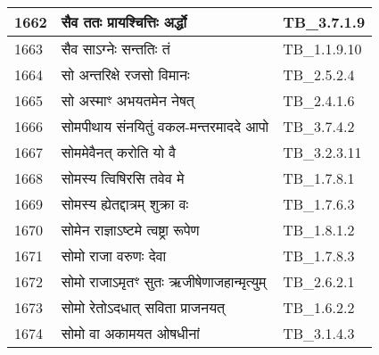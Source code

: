 \documentclass[17pt]{extarticle}
\begin{document}
\begin{longtable}{||p{0.4in}||p{4.9in}||p{0.9in}||}
    1662 & सैव ततः प्रायश्चित्तिः अर्द्धो & TB\_3.7.1.9       \\
    
    \hline
        
    1663 & सैव साऽग्नेः सन्ततिः तं & TB\_1.1.9.10       \\
    
    \hline
        
    1664 & सो अन्तरिक्षे रजसो विमानः & TB\_2.5.2.4       \\
    
    \hline
        
    1665 & सो अस्माꣳ अभयतमेन नेषत् & TB\_2.4.1.6       \\
    
    \hline
        
    1666 & सोमपीथाय संनयितुं वकल{-}मन्तरमाददे आपो & TB\_3.7.4.2       \\
    
    \hline
        
    1667 & सोममेवैनत् करोति यो वै & TB\_3.2.3.11       \\
    
    \hline
        
    1668 & सोमस्य त्विषिरसि तवेव मे & TB\_1.7.8.1       \\
    
    \hline
        
    1669 & सोमस्य ह्येतद्दात्रम् शुक्रा वः & TB\_1.7.6.3       \\
    
    \hline
        
    1670 & सोमेन राज्ञाऽष्टमे त्वष्ट्रा रूपेण & TB\_1.8.1.2       \\
    
    \hline
        
    1671 & सोमो राजा वरुणः देवा & TB\_1.7.8.3       \\
    
    \hline
        
    1672 & सोमो राजाऽमृतꣳ सुतः ऋजीषेणाजहान्मृत्युम् & TB\_2.6.2.1       \\
    
    \hline
        
    1673 & सोमो रेतोऽदधात् सविता प्राजनयत् & TB\_1.6.2.2       \\
    
    \hline
        
    1674 & सोमो वा अकामयत ओषधीनां & TB\_3.1.4.3       \\
    

\end{longtable}
\end{document}
